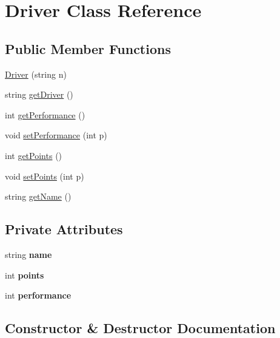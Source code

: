 \hypertarget{classDriver}{}\section{Driver Class Reference}
\label{classDriver}
\subsection*{Public Member Functions}
\begin{DoxyCompactItemize}
\item 
\hyperlink{classDriver_a734f2178611130af5034263ab26f73ea}{Driver} (string n)
\item 
string \hyperlink{classDriver_abd055f2390a62d8347115e6616ce5aa3}{get\+Driver} ()
\item 
int \hyperlink{classDriver_a96ea452112b25946d7a68005e75bd125}{get\+Performance} ()
\item 
void \hyperlink{classDriver_aa8e4524d765561c16d2bf6072e963e83}{set\+Performance} (int p)
\item 
int \hyperlink{classDriver_a7d527bc5a262fcba16f239103969bbc3}{get\+Points} ()
\item 
void \hyperlink{classDriver_a10b1b27d8d99ed19304b69727f0a0504}{set\+Points} (int p)
\item 
string \hyperlink{classDriver_ae85810c10f8aa5f9db23633b5c86edcf}{get\+Name} ()
\end{DoxyCompactItemize}
\subsection*{Private Attributes}
\begin{DoxyCompactItemize}
\item 
\mbox{\label{classDriver_ae79d2632e3d41e17f3b213af9a7b6800}} 
string {\bfseries name}
\item 
\mbox{\label{classDriver_ab856ecbd7adbda0b6248a11eacb03fb1}} 
int {\bfseries points}
\item 
\mbox{\label{classDriver_a3d3f4166a17fb78efe1dc76890ee6d3a}} 
int {\bfseries performance}
\end{DoxyCompactItemize}


\subsection{Constructor \& Destructor Documentation}
\mbox{\label{classDriver_a734f2178611130af5034263ab26f73ea}} 
